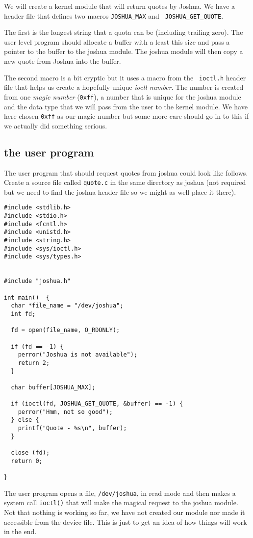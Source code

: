 \documentclass[a4paper,11pt]{article}
\begin{document}
We will create a kernel module that will return quotes by Joshua. We
have a header file that defines two macros {\tt JOSHUA\_MAX} and {\tt
  JOSHUA\_GET\_QUOTE}.

The first is the longest string that a quota can be (including trailing
zero). The user level program should allocate a buffer with a least
this size and pass a pointer to the buffer to the joshua module. The
joshua module will then copy a new quote from Joshua into the
buffer.

The second macro is a bit cryptic but it uses a macro from the {\tt
  ioctl.h} header file that helps us create a hopefully unique {\em
  ioctl number}. The number is created from one {\em magic number}
({\tt 0xff}), a number that is unique for the joshua module and the
data type that we will pass from the user to the kernel module. We
have here chosen {\tt 0xff} as our magic number but some more care
should go in to this if we actually did something serious.

\subsection{the user program}

The user program that should request quotes from joshua could look
like follows. Create a source file called {\tt quote.c} in the same
directory as joshua (not required but we need to find the joshua
header file so we might as well place it there).

\begin{lstlisting}
#include <stdlib.h>
#include <stdio.h>
#include <fcntl.h>
#include <unistd.h>
#include <string.h>
#include <sys/ioctl.h>
#include <sys/types.h> 


#include "joshua.h"

int main()  {
  char *file_name = "/dev/joshua";
  int fd;

  fd = open(file_name, O_RDONLY);
  
  if (fd == -1) {
    perror("Joshua is not available");
    return 2;
  }

  char buffer[JOSHUA_MAX];
 
  if (ioctl(fd, JOSHUA_GET_QUOTE, &buffer) == -1) {
    perror("Hmm, not so good");
  } else {
    printf("Quote - %s\n", buffer);
  }
  
  close (fd);
  return 0;
  
}
\end{lstlisting}

The user program opens a file, {\tt /dev/joshua}, in read mode and
then makes a system call {\tt ioctl()} that will make the magical
request to the joshua module. Not that nothing is working so far, we
have not created our module nor made it accessible from the device
file. This is just to get an idea of how things will work in the end.
\end{document}
